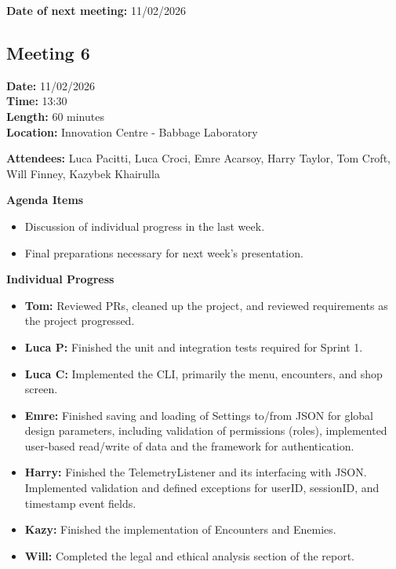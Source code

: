 \documentclass[11pt]{article}
\begin{document}
    \textbf{Date of next meeting:} 11/02/2026



    \vspace{1.5\baselineskip}
    \subsection{Meeting 6}

    \textbf{Date:} 11/02/2026 \\
    \textbf{Time:} 13:30 \\
    \textbf{Length:} 60 minutes \\
    \textbf{Location:} Innovation Centre - Babbage Laboratory

    \textbf{Attendees:} Luca Pacitti, Luca Croci, Emre Acarsoy, Harry Taylor, Tom Croft, Will Finney, Kazybek Khairulla

    \textbf{Agenda Items}
    \begin{itemize}
        \item Discussion of individual progress in the last week.
        \item Final preparations necessary for next week's presentation.
    \end{itemize}

    \textbf{Individual Progress}
    \begin{itemize}
        \item \textbf{Tom:} Reviewed PRs, cleaned up the project, and reviewed requirements as the project progressed.

        \item \textbf{Luca P:} Finished the unit and integration tests required for Sprint 1.

        \item \textbf{Luca C:} Implemented the CLI, primarily the menu, encounters, and shop screen.

        \item \textbf{Emre:} Finished saving and loading of Settings to/from JSON for global design parameters, including validation of permissions (roles), implemented user-based read/write of data and the framework for authentication.

        \item \textbf{Harry:} Finished the TelemetryListener and its interfacing with JSON. Implemented validation and defined exceptions for userID, sessionID, and timestamp event fields.

        \item \textbf{Kazy:} Finished the implementation of Encounters and Enemies.

        \item \textbf{Will:} Completed the legal and ethical analysis section of the report.
    \end{itemize}
\end{document}
